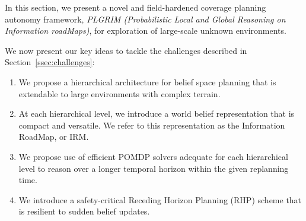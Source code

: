 \documentclass[letterpaper]{article} %
\newcommand{\phdone}[1]{} %
\begin{document}
\phdone{Framework Overview}
In this section, we present a novel and field-hardened coverage planning autonomy framework, \textit{PLGRIM (Probabilistic Local and Global Reasoning on Information roadMaps)}, for exploration of large-scale unknown environments.

We now present our key ideas to tackle the challenges described in Section~\ref{ssec:challenges}:


\vspace{-4pt}
\begin{enumerate}[label={\arabic*)}]
  \itemsep0em 
  \setlength{\itemsep}{0pt}
  \setlength{\parskip}{0pt}
  \item \label{en:idea1} We propose a hierarchical architecture for belief space planning that is extendable to large environments with complex terrain. 
  \item \label{en:idea2} At each hierarchical level, we introduce a world belief representation that is compact and versatile. We refer to this representation as the Information RoadMap, or IRM.
  \item \label{en:idea3} We propose use of efficient POMDP solvers adequate for each hierarchical level to reason over a longer temporal horizon within the given replanning time. 
  \item \label{en:idea4} We introduce a safety-critical Receding Horizon Planning (RHP) scheme that is resilient to sudden belief updates.    
\end{enumerate}
\vspace{-4pt}


\end{document}
